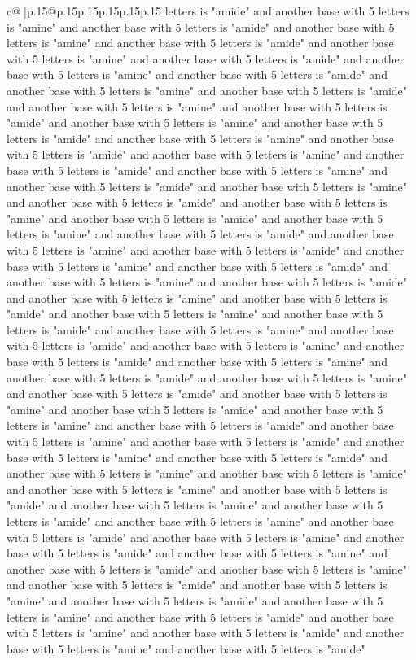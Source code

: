 \documentclass{article}
\begin{document}
{\begin{supertabular}{c@{$\;$}|p{.15\linewidth}@{}p{.15\linewidth}p{.15\linewidth}p{.15\linewidth}p{.15\linewidth}p{.15\linewidth}}
{{{letters is "amide" and another base with 5 letters is "amine" and another base with 5 letters is "amide" and another base with 5 letters is "amine" and another base with 5 letters is "amide" and another base with 5 letters is "amine" and another base with 5 letters is "amide" and another base with 5 letters is "amine" and another base with 5 letters is "amide" and another base with 5 letters is "amine" and another base with 5 letters is "amide" and another base with 5 letters is "amine" and another base with 5 letters is "amide" and another base with 5 letters is "amine" and another base with 5 letters is "amide" and another base with 5 letters is "amine" and another base with 5 letters is "amide" and another base with 5 letters is "amine" and another base with 5 letters is "amide" and another base with 5 letters is "amine" and another base with 5 letters is "amide" and another base with 5 letters is "amine" and another base with 5 letters is "amide" and another base with 5 letters is "amine" and another base with 5 letters is "amide" and another base with 5 letters is "amine" and another base with 5 letters is "amide" and another base with 5 letters is "amine" and another base with 5 letters is "amide" and another base with 5 letters is "amine" and another base with 5 letters is "amide" and another base with 5 letters is "amine" and another base with 5 letters is "amide" and another base with 5 letters is "amine" and another base with 5 letters is "amide" and another base with 5 letters is "amine" and another base with 5 letters is "amide" and another base with 5 letters is "amine" and another base with 5 letters is "amide" and another base with 5 letters is "amine" and another base with 5 letters is "amide" and another base with 5 letters is "amine" and another base with 5 letters is "amide" and another base with 5 letters is "amine" and another base with 5 letters is "amide" and another base with 5 letters is "amine" and another base with 5 letters is "amide" and another base with 5 letters is "amine" and another base with 5 letters is "amide" and another base with 5 letters is "amine" and another base with 5 letters is "amide" and another base with 5 letters is "amine" and another base with 5 letters is "amide" and another base with 5 letters is "amine" and another base with 5 letters is "amide" and another base with 5 letters is "amine" and another base with 5 letters is "amide" and another base with 5 letters is "amine" and another base with 5 letters is "amide" and another base with 5 letters is "amine" and another base with 5 letters is "amide" and another base with 5 letters is "amine" and another base with 5 letters is "amide" and another base with 5 letters is "amine" and another base with 5 letters is "amide" and another base with 5 letters is "amine" and another base with 5 letters is "amide" and another base with 5 letters is "amine" and another base with 5 letters is "amide" and another base with 5 letters is "amine" and another base with 5 letters is "amide" and another base with 5 letters is "amine" and another base with 5 letters is "amide" and another base with 5 letters is "amine" and another base with 5 letters is "amide" }}}
\end{supertabular}}
\end{document}
